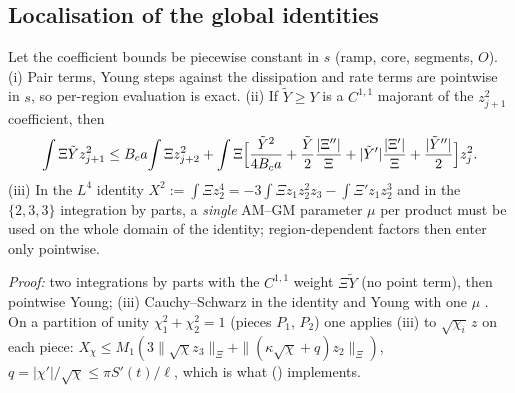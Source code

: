 \documentclass[11pt]{article}
\begin{document}
\subsection{Localisation of the global identities}
\begin{lemma}\label{A:lem:L}
Let the coefficient bounds be piecewise constant in $s$ (ramp, core, segments, $O$). (i) Pair terms, Young steps against the dissipation and rate terms are pointwise in $s$, so per-region evaluation is exact. (ii) If $\tilde Y\ge Y$ is a $C^{1,1}$ majorant of the $z_{j+1}^2$ coefficient, then
\[
\int\Xi\tilde Yz_{j+1}^2\le B_ca\!\int\Xi z_{j+2}^2+\int\Xi\Bigl[\frac{\tilde Y^2}{4B_ca}+\frac{\tilde Y}2\frac{|\Xi''|}{\Xi}+|\tilde Y'|\frac{|\Xi'|}{\Xi}+\frac{|\tilde Y''|}2\Bigr]z_j^2 .
\]
(iii) In the $L^4$ identity $X^2:=\int\Xi z_2^4=-3\int\Xi z_1z_2^2z_3-\int\Xi'z_1z_2^3$ and in the $\{2,3,3\}$ integration by parts, a \emph{single} AM--GM parameter $\mu$ per product must be used on the whole domain of the identity; region-dependent factors then enter only pointwise.
\end{lemma}
\noindent\emph{Proof:} two integrations by parts with the $C^{1,1}$ weight $\Xi\tilde Y$ (no point term), then pointwise Young; (iii) Cauchy--Schwarz in the identity and Young with one $\mu$ \tP. On a partition of unity $\chi_1^2+\chi_2^2=1$ (pieces $P_1$, $P_2$) one applies (iii) to $\sqrt{\chi_i}\,z$ on each piece: $X_\chi\le M_1(3\|\sqrt\chi z_3\|_\Xi+\|(\kappa\sqrt\chi+q)z_2\|_\Xi)$, $q=|\chi'|/\sqrt\chi\le\pi S'(t)/\ell$, which is what  () implements.
\end{document}
